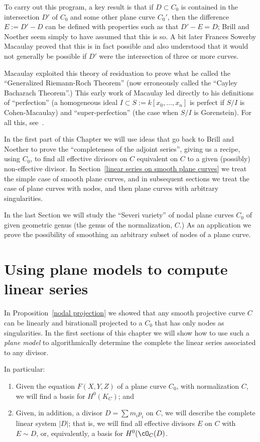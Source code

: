 To carry out this program, a key result is that if $D\subset C_0$ is contained in the intersection
$D'$ of $C_0$ and some other plane curve $C_0'$, then the difference 
$E := D'-D$ can be defined with properties such as that $D'-E = D$; Brill and Noether seem simply to have assumed that this is so. A bit later Frances Sowerby Macaulay proved that this is in fact possible  and also understood that it would not generally be possible if $D'$ were the intersection of three or more curves. 

Macaulay exploited this theory of residuation  to prove what he called the ``Generalized Riemann-Roch Theorem'' (now erroneously called the ``Cayley Bacharach Theorem''.) This early work of Macaulay led directly to his definitions of  ``perfection'' (a homogeneous ideal
$I  \subset S:= k[x_0, \dots, x_n]$ is perfect if $S/I$ is Cohen-Macaulay) and ``super-perfection'' (the case when $S/I$ is
Gorenstein). For all this, see~\cite{Eisenbud-Gray}.

In the first part of this Chapter we will use ideas that go back to Brill and Noether to prove the ``completeness of the adjoint series'', giving us a recipe, using $C_0$, to find all effective divisors on $C$ equivalent on $C$ to a given (possibly) non-effective divisor. In Section~\ref{linear series on smooth plane curves} we treat the simple case of smooth plane curves, and in subsequent sections we treat the case of plane curves with nodes, and then plane curves with arbitrary singularities.

 In the last Section we will study the ``Severi variety'' of nodal plane curves $C_0$ of given geometric genus (the genus of the normalization, $C$.) As an application we prove the possibility of smoothing an arbitrary subset of nodes of a plane curve.
 
\section{Using plane models to compute linear series} \label{computing linear series}

In Proposition~\ref{nodal projection} we showed that any smooth projective curve $C$ can be linearly and birationall projected to a $C_0$ that has only nodes as singularities. In the first sections of this chapter we will show how to use such a \emph{plane model} to algorithmically determine the complete the linear series associated to any divisor.

In particular:
\begin{enumerate}
\item Given the equation $F(X,Y,Z)$ of a plane curve $C_0$, with normalization $C$, we will find a basis for $H^0(K_C)$; and
\item  Given, in addition, a divisor $D = \sum m_ip_i$ on $C$, we will describe the complete linear system $|D|$; that is, we will find all effective divisors $E$ on $C$ with $E \sim D$, or, equivalently, a basis for $H^0(\cO_C(D)$.
\end{enumerate}

